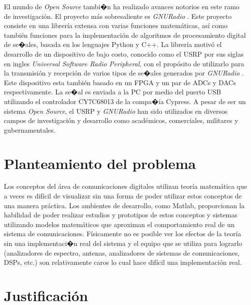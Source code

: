 El mundo de \emph{Open Source} tambi�n ha realizado avances notorios en este
ramo de investigaci\'on. El proyecto m\'as sobresaliente es
\emph{GNURadio} \cite{radio}. Este proyecto consiste en una librer\'ia extensa
con varias funciones matem\'aticas, as\'i como tambi\'en funciones para la
implementaci\'on de algoritmos de procesamiento digital de se�ales, basada en los lenguajes Python y C++. 
La librer\'ia motiv\'o el desarrollo de un dispositivo de bajo costo, conocido
como el USRP por sus siglas en ingles \emph{Universal Software Radio Peripheral}, con el prop\'osito de
utilizarlo para la transmisi\'on y recepci\'on de varios tipos de se�ales
generados por \emph{GNURadio} \cite{ettus}. Este dispositivo esta tambi\'en
basado en un FPGA y un par de ADCs y DACs respectivamente. La se�al es enviada a la PC por 
medio del puerto USB utilizando el controlador CY7C68013 de la compa�\'ia
Cypress. A pesar de ser un sistema \emph{Open Source}, el USRP y \emph{GNURadio}
han sido utilizados en diversos campos de investigaci\'on y desarrollo como
acad\'emicos, comerciales, militares y gubernamentales.

\section{Planteamiento del problema}
Los conceptos del \'area de comunicaciones digitales utilizan 
teor\'ia matem\'atica que a veces es dif\'icil de visualizar sin una 
forma de poder utilizar estos conceptos de una manera pr\'actica.
Los ambientes de desarrollo, 
como Matlab, proporcionan la habilidad de poder realizar estudios y prototipos 
de estos conceptos y sistemas utilizando modelos matem\'aticos que aproximan el 
comportamiento real de un sistema de comunicaciones. F\'isicamente no es
posible ver los efectos de la teor\'ia sin una implementaci�n real del sistema y
el equipo que se utiliza para lograrlo (analizadores de espectro, antenas, 
analizadores de sistemas de comunicaciones, DSPs, etc.) son relativamente 
caros lo cual hace dif\'icil una implementaci\'on real.
 

\section{Justificaci\'on}

